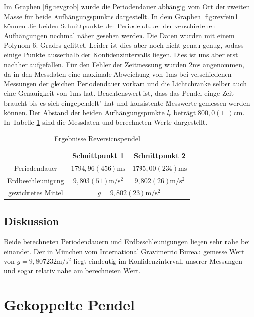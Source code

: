 \documentclass[11pt, a4paper]{article}
\begin{document}
    Im Graphen \ref{fig:revgrob} wurde die Periodendauer abhängig vom Ort der zweiten Masse für beide Aufhängungspunkte dargestellt. 
    In dem Graphen \ref{fig:revfein1}  können die beiden Schnittpunkte der Periodendauer der verschiedenen
    Aufhängungen nochmal näher gesehen werden. Die Daten wurden mit einem Polynom 6. Grades gefittet.
    Leider ist dies aber noch nicht genau genug, sodass einige Punkte ausserhalb
    der Konfidenzintervalls liegen. Dies ist uns aber erst nachher aufgefallen. Für den Fehler der Zeitmessung
    wurden $2 \si{\milli\second}$ angenommen, da in den Messdaten eine maximale Abweichung von $1\si{\milli\second}$ bei verschiedenen Messungen 
    der gleichen Periodendauer vorkam und die Lichtchranke selber auch eine Genauigkeit von $1\si{\milli\second}$ hat.
    Beachtenswert ist, dass das Pendel einge Zeit braucht bis es sich eingependelt" hat und konsistente Messwerte
    gemessen werden können. Der Abstand der beiden Aufhängungspunkte $l_r$ beträgt $800,0(11)\si{\centi\metre}$.
    In Tabelle \ref{ergrev} sind die Messdaten und berechneten Werte dargestellt. 

    \begin{table}[H]
        \centering
        \begin{tabular}{c c c}
            & Schnittpunkt 1 & Schnittpunkt 2 \\ \hline
            Periodendauer &  $1794,96(456)\si{\milli\second} $ & $1795,00(234)\si{\milli\second} $ \\
            Erdbeschleunigung & $9,803(51)\si{\metre\per\second\squared}$ & $9,802(26)\si{\metre\per\second\squared}$ \\
            gewichtetes Mittel & \multicolumn{2}{c}{$g = 9,802(23)\si{\metre\per\square\second}$}
        \end{tabular}
        \caption{Ergebnisse Reversionspendel}
        \label{ergrev}
    \end{table}

    \subsection{Diskussion}
    Beide berechneten Periodendauern und Erdbeschleunigungen liegen sehr nahe bei einander.
    Der in München vom International Gravimetric Bureau gemesse Wert von $g = 9,807232\si{\metre\per\second\squared}$ \cite{glit} liegt
    eindeutig im Konfidenzintervall unserer Messungen und sogar relativ nahe am berechneten Wert.


    \section{Gekoppelte Pendel}
\end{document}
